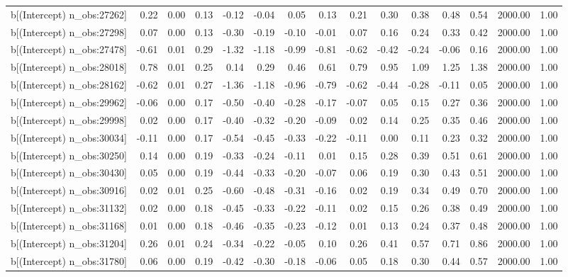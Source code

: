 \begin{table}[ht]
\begin{tabular}{rrrrrrrrrrrrrrr}
  b[(Intercept) n\_obs:27262] & 0.22 & 0.00 & 0.13 & -0.12 & -0.04 & 0.05 & 0.13 & 0.21 & 0.30 & 0.38 & 0.48 & 0.54 & 2000.00 & 1.00 \\ 
  b[(Intercept) n\_obs:27298] & 0.07 & 0.00 & 0.13 & -0.30 & -0.19 & -0.10 & -0.01 & 0.07 & 0.16 & 0.24 & 0.33 & 0.42 & 2000.00 & 1.00 \\ 
  b[(Intercept) n\_obs:27478] & -0.61 & 0.01 & 0.29 & -1.32 & -1.18 & -0.99 & -0.81 & -0.62 & -0.42 & -0.24 & -0.06 & 0.16 & 2000.00 & 1.00 \\ 
  b[(Intercept) n\_obs:28018] & 0.78 & 0.01 & 0.25 & 0.14 & 0.29 & 0.46 & 0.61 & 0.79 & 0.95 & 1.09 & 1.25 & 1.38 & 2000.00 & 1.00 \\ 
  b[(Intercept) n\_obs:28162] & -0.62 & 0.01 & 0.27 & -1.36 & -1.18 & -0.96 & -0.79 & -0.62 & -0.44 & -0.28 & -0.11 & 0.05 & 2000.00 & 1.00 \\ 
  b[(Intercept) n\_obs:29962] & -0.06 & 0.00 & 0.17 & -0.50 & -0.40 & -0.28 & -0.17 & -0.07 & 0.05 & 0.15 & 0.27 & 0.36 & 2000.00 & 1.00 \\ 
  b[(Intercept) n\_obs:29998] & 0.02 & 0.00 & 0.17 & -0.40 & -0.32 & -0.20 & -0.09 & 0.02 & 0.14 & 0.25 & 0.35 & 0.46 & 2000.00 & 1.00 \\ 
  b[(Intercept) n\_obs:30034] & -0.11 & 0.00 & 0.17 & -0.54 & -0.45 & -0.33 & -0.22 & -0.11 & 0.00 & 0.11 & 0.23 & 0.32 & 2000.00 & 1.00 \\ 
  b[(Intercept) n\_obs:30250] & 0.14 & 0.00 & 0.19 & -0.33 & -0.24 & -0.11 & 0.01 & 0.15 & 0.28 & 0.39 & 0.51 & 0.61 & 2000.00 & 1.00 \\ 
  b[(Intercept) n\_obs:30430] & 0.05 & 0.00 & 0.19 & -0.44 & -0.33 & -0.20 & -0.07 & 0.06 & 0.19 & 0.30 & 0.43 & 0.51 & 2000.00 & 1.00 \\ 
  b[(Intercept) n\_obs:30916] & 0.02 & 0.01 & 0.25 & -0.60 & -0.48 & -0.31 & -0.16 & 0.02 & 0.19 & 0.34 & 0.49 & 0.70 & 2000.00 & 1.00 \\ 
  b[(Intercept) n\_obs:31132] & 0.02 & 0.00 & 0.18 & -0.45 & -0.33 & -0.22 & -0.11 & 0.02 & 0.15 & 0.26 & 0.38 & 0.49 & 2000.00 & 1.00 \\ 
  b[(Intercept) n\_obs:31168] & 0.01 & 0.00 & 0.18 & -0.46 & -0.35 & -0.23 & -0.12 & 0.01 & 0.13 & 0.24 & 0.37 & 0.48 & 2000.00 & 1.00 \\ 
  b[(Intercept) n\_obs:31204] & 0.26 & 0.01 & 0.24 & -0.34 & -0.22 & -0.05 & 0.10 & 0.26 & 0.41 & 0.57 & 0.71 & 0.86 & 2000.00 & 1.00 \\ 
  b[(Intercept) n\_obs:31780] & 0.06 & 0.00 & 0.19 & -0.42 & -0.30 & -0.18 & -0.06 & 0.05 & 0.18 & 0.30 & 0.44 & 0.57 & 2000.00 & 1.00 \\ 

\end{tabular}
\end{table}
